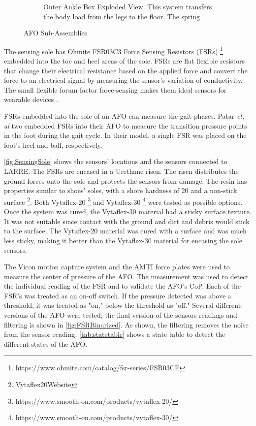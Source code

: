 \begin{figure}[h!]
\begin{subfigure}[b]{.45\textwidth}
        \caption{Outer Ankle Box Exploded View. This system transfers the body load from the legs to the floor. The spring }
        \label{fig:Outer Ankle Box fig}
    \end{subfigure}%
    \caption{AFO Sub-Assemblies}
    \label{fig:AFO Sub-Assemblies}
\end{figure}


The sensing sole has Ohmite FSR03C3 Force Sensing Resistors (FSRs) \footnote{https://www.ohmite.com/catalog/fsr-series/FSR03CE} embedded into the toe and heel areas of the sole. FSRs are flat flexible resistors that change their electrical resistance based on the applied force \cite{yaniger1991force} and convert the force to an electrical signal by measuring the sensor's variation of conductivity. The small flexible forum factor force-sensing makes them ideal sensors for wearable devices \cite{giovanelli2016force}.    

FSRs embedded into the sole of an AFO can measure the gait phases. Patar \textit{et. al} two embedded FSRs into their AFO to measure the transition pressure points in the foot during the gait cycle\cite{ab2014system}. In their model, a single FSR was placed on the foot's heel and ball, respectively.  

\autoref{fig:SensingSole} shows the sensors' locations and the sensors connected to LARRE. The FSRs are encased in a Urethane risen. The risen distributes the ground forces onto the sole and protects the sensors from damage. The resin has properties similar to shoes' soles, with a shore hardness of 20 and a non-stick surface \footnote{Vytaflex20Website}. Both Vytaflex-20 \footnote{https://www.smooth-on.com/products/vytaflex-20/} and Vytaflex-30 \footnote{https://www.smooth-on.com/products/vytaflex-30/} were tested as possible options. Once the system was cured, the Vytaflex-30 material had a sticky surface texture. It was not suitable since contact with the ground and dirt and debris would stick to the surface. The Vytaflex-20 material was cured with a surface and was much less sticky, making it better than the Vytaflex-30 material for encasing the sole sensors. 

The Vicon motion capture system and the AMTI force plates were used to measure the center of pressure of the AFO. The measurement was used to detect the individual reading of the FSR and to validate the AFO's CoP. Each of the FSR's was treated as an on-off switch. If the pressure detected was above a threshold, it was treated as "on," below the threshold as "off."  Several different versions of the AFO were tested; the final version of the sensors readings and filtering is shown in \autoref{fig:FSRBinarized}. As shown, the filtering removes the noise from the sensor reading. \autoref{tab:statetable} shows a state table to detect the different states of the AFO. 

